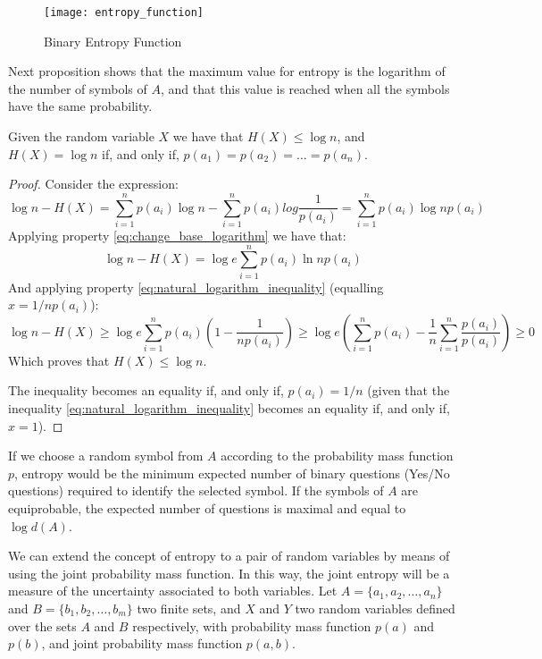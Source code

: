 \begin{figure}[h]
\centering\texttt{[image: entropy\_function]}
\caption{\label{fig:entropy_function}Binary Entropy Function}
\end{figure}

Next proposition shows that the maximum value for entropy is the logarithm of the number of symbols of $A$, and that this value is reached when all the symbols have the same probability.

\begin{proposition}
\label{prop:maximum_entropy}
Given the random variable $X$ we have that $H(X) \leq \log n$, and $H(X) = \log n$ if, and only if, $p(a_1) = p(a_2) = \ldots = p(a_n)$.
\end{proposition}
\begin{proof}
Consider the expression:
\[
\log n - H(X) = \sum_{i=1}^n p(a_i) \log n - \sum_{i=1}^n p(a_i) log {\frac{1}{p(a_i)}} = \sum_{i=1}^n p(a_i) \log n p(a_i)
\]
Applying property \ref{eq:change_base_logarithm} we have that:
\[
\log n - H(X) = \log e \sum_{i=1}^n p(a_i) \ln n p(a_i)
\]
And applying property \ref{eq:natural_logarithm_inequality} (equalling $x = 1 / n p(a_i)$):
\[
\log n - H(X) \geq \log e \sum_{i=1}^n p(a_i) \left( 1 - \frac{1}{n p(a_i)} \right) \geq \log e \left( \sum_{i=1}^n p(a_i) - \frac{1}{n} \sum_{i=1}^n \frac{p(a_i)}{p(a_i)} \right) \geq 0
\]
Which proves that $H(X) \leq \log n$.

The inequality becomes an equality if, and only if, $p(a_i) = 1 / n$ (given that the inequality \ref{eq:natural_logarithm_inequality} becomes an equality if, and only if, $x=1$).

\end{proof}

\begin{example}
If we choose a random symbol from $A$ according to the probability mass function $p$, entropy would be the minimum expected number of binary questions (Yes/No questions) required to identify the selected symbol. If the symbols of $A$ are equiprobable, the expected number of questions is maximal and equal to $\log d(A)$.
\end{example}

We can extend the concept of entropy to a pair of random variables by means of using the joint probability mass function. In this way, the joint entropy will be a measure of the uncertainty associated to both variables. Let $A = \{a_1, a_2, \ldots, a_n\}$ and $B = \{b_1, b_2, \dots, b_m\}$ two finite sets, and $X$ and $Y$ two random variables defined over the sets $A$ and $B$ respectively, with probability mass function $p(a)$ and $p(b)$, and joint probability mass function $p(a, b)$.

